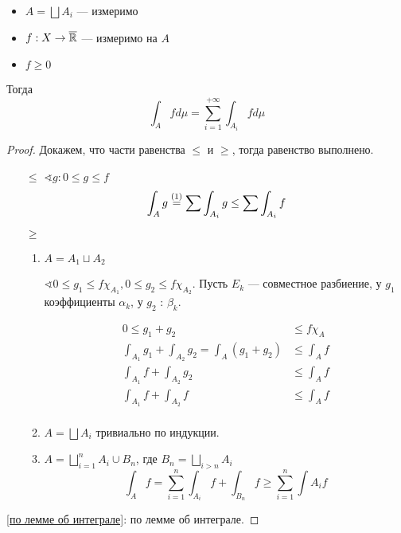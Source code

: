 \begin{theorem}\itemfix
    \begin{itemize}
        \item \(A = \bigsqcup A_i\) --- измеримо
        \item \(f : X \to \overline {\mathbb{R}}\) --- измеримо на \(A\)
        \item \(f \geq 0\)
    \end{itemize}

    Тогда \[\int_A f d\mu = \sum_{i = 1}^{+\infty} \int_{A_i} f d\mu\]
\end{theorem}
\begin{proof}\itemfix
    Докажем, что части равенства \( \leq \) и \( \geq \), тогда равенство выполнено.

    \begin{itemize}
        \item [ \( \leq \)] \(\sphericalangle g : 0 \leq g \leq f\)
              \[\int_A g \symrefeq{по лемме об интеграле} \sum\int_{A_i} g \leq \sum \int_{A_i} f\]

        \item [ \( \geq \)]
              \begin{enumerate}
                  \item \(A = A_1 \sqcup A_2\)

                        \(\sphericalangle 0 \leq g_1 \leq f \chi_{A_1}, 0 \leq g_2 \leq f \chi_{A_2}\). Пусть \(E_k\) --- совместное разбиение, у \(g_1\) коэффициенты \(\alpha_k\), у \(g_2\) : \(\beta_k\).

                        \begin{align*}
                            0 \leq g_1 + g_2                                     & \leq f \chi_A \\
                            \int_{A_1} g_1 + \int_{A_2} g_2 = \int_A (g_1 + g_2) & \leq \int_A f \\
                            \int_{A_1} f + \int_{A_2} g_2                        & \leq \int_A f \\
                            \int_{A_1} f + \int_{A_2} f                          & \leq \int_A f \\
                        \end{align*}

                  \item \(A = \bigsqcup A_i\) тривиально по индукции.
                  \item \(A = \bigsqcup_{i = 1}^n A_i \cup B_n\), где \(B_n = \bigsqcup_{i > n} A_i\)
                        \[\int_A f = \sum_{i = 1}^n \int_{A_i} f + \int_{B_n} f \geq \sum_{i = 1}^n \int A_i f\]
              \end{enumerate}
    \end{itemize}

    \ref{по лемме об интеграле}: по лемме об интеграле.
\end{proof}

